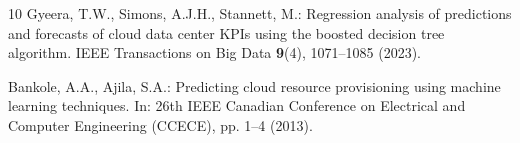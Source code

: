\documentclass[runningheads]{llncs}
\begin{document}
\begin{thebibliography}{10}
Gyeera, T.W., Simons, A.J.H., Stannett, M.: Regression analysis of
predictions and forecasts of cloud data center KPIs using the boosted
decision tree algorithm. IEEE Transactions on Big Data \textbf{9}(4),
1071--1085 (2023). 

Bankole, A.A., Ajila, S.A.: Predicting cloud resource provisioning
using machine learning techniques. In: 26th IEEE Canadian Conference
on Electrical and Computer Engineering (CCECE), pp. 1--4 (2013).

\end{thebibliography}
\end{document}
